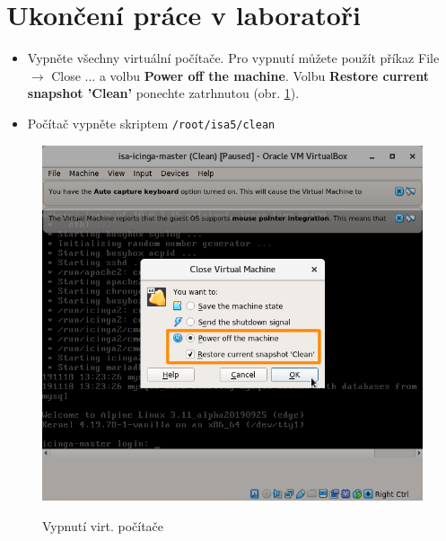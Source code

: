 \section*{Ukončení práce v laboratoři}
\begin{itemize}
  \item Vypněte všechny virtuální počítače. Pro vypnutí můžete použít příkaz File $\rightarrow$ Close ... a volbu {\bf Power off the machine}. Volbu {\bf Restore current snapshot 'Clean'} ponechte zatrhnutou (obr. \ref{fig:shutdown}).
  \item Počítač vypněte skriptem {\tt /root/isa5/clean}
\end{itemize}

\begin{figure}
	\caption{Vypnutí virt. počítače}
	\centering
	\includegraphics[width=0.67\linewidth]{files/vbox-shutdown.png}
	\label{fig:shutdown}
\end{figure}

